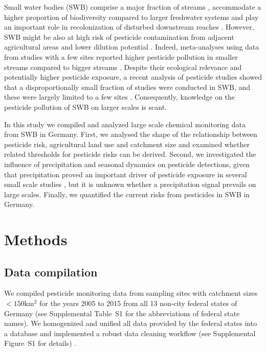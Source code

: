 \documentclass[journal=esthag,manuscript=article]{achemso}
\begin{document}
Small water bodies (SWB) comprise a major fraction of streams \citep{nadeau_hydrological_2007}
, accommodate a higher proportion of biodiversity compared to larger freshwater systems \citep{davies_comparison_2008, biggs_report_2014} and play an important role in recolonization of disturbed downstream reaches \citep{liess_analyzing_2005, orlinskiy_forested_2015}.
However, SWB might be also at high risk of pesticide contamination from adjacent agricultural areas and lower dilution potential \citep{schulz_field_2004,liess_determination_1999}.
Indeed, meta-analyses using data from studies with a few sites reported higher pesticide pollution in smaller streams compared to bigger streams \citep{stehle_pesticide_2015,schulz_field_2004}.
Despite their ecological relevance and potentially higher pesticide exposure, a recent analysis of pesticide studies showed that a disproportionally small fraction of studies were conducted in SWB, and these were largely limited to a few sites \citep{lorenz_specifics_2016}. Consequently, knowledge on the pesticide pollution of SWB on larger scales is scant.

In this study we compiled and analyzed large scale chemical monitoring data from SWB in Germany. First, we analysed the shape of the relationship between pesticide risk, agricultural land use and catchment size and examined whether related thresholds for pesticide risks can be derived. Second, we investigated the influence of precipitation and seasonal dynamics on pesticide detections, given that precipitation proved an important driver of pesticide exposure in several small scale studies \citep{wittmer_significance_2010}\citep{schulz_field_2004}, but it is unknown whether a precipitation signal prevails on large scales. 
Finally, we quantified the current risks from pesticides in SWB in Germany.



\section{Methods}
\subsection{Data compilation}
We compiled pesticide monitoring data from sampling sites with catchment sizes $\mathrm{< 150km^2}$ for the years 2005 to 2015 from all 13 non-city federal states of Germany (see Supplemental Table~S1 for the abbreviations of federal state names). 
We homogenized and unified all data provided by the federal states into a database and implemented a robust data cleaning workflow (see Supplemental Figure~S1 for details) \citep{poisot_best_2015}.
\end{document}
